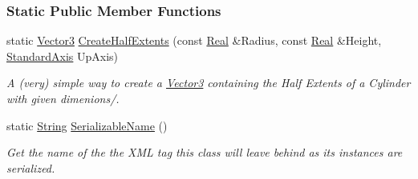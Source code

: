 \subsubsection*{Static Public Member Functions}
\begin{DoxyCompactItemize}
\item 
static \hyperlink{classMezzanine_1_1Vector3}{Vector3} \hyperlink{classMezzanine_1_1CylinderCollisionShape_af084233b246cdf7497ed2739d9ba361e}{CreateHalfExtents} (const \hyperlink{namespaceMezzanine_a726731b1a7df72bf3583e4a97282c6f6}{Real} \&Radius, const \hyperlink{namespaceMezzanine_a726731b1a7df72bf3583e4a97282c6f6}{Real} \&Height, \hyperlink{namespaceMezzanine_ab41a00a8c6a47b576dc987ec34e16ba1}{StandardAxis} UpAxis)
\begin{DoxyCompactList}\small\item\em A (very) simple way to create a \hyperlink{classMezzanine_1_1Vector3}{Vector3} containing the Half Extents of a Cylinder with given dimenions/. \item\end{DoxyCompactList}\item 
static \hyperlink{namespaceMezzanine_acf9fcc130e6ebf08e3d8491aebcf1c86}{String} \hyperlink{classMezzanine_1_1CylinderCollisionShape_a7fa7200a26ab2788416c729e28ed6688}{SerializableName} ()
\begin{DoxyCompactList}\small\item\em Get the name of the the XML tag this class will leave behind as its instances are serialized. \item\end{DoxyCompactList}\end{DoxyCompactItemize}
